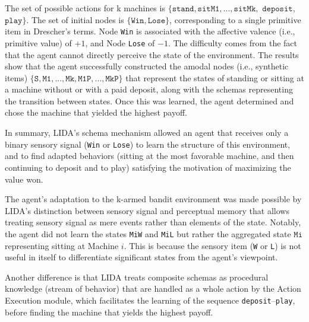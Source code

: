 \documentclass[runningheads]{llncs}
\begin{document}
The set of possible actions for k machines is $\{ \texttt{stand}, \texttt{sitM1},..., \texttt{sitMk},$ $\texttt{deposit},$ $\texttt{play} \}$. 
The set of initial nodes is $\{\texttt{Win}, \texttt{Lose} \}$, corresponding to a single primitive item in Drescher's terms.
Node \texttt{Win} is associated with the affective valence (i.e., primitive value) of $+1$, and Node \texttt{Lose} of $-1$.   
The difficulty comes from the fact that the agent cannot directly perceive the state of the environment.
The results show that the agent successfully constructed the amodal nodes (i.e., synthetic items) $\{ \texttt{S}, \texttt{M1},  ..., \texttt{Mk}, \texttt{M1P}, ...,  \texttt{MkP} \}$ that represent the states of standing or sitting at a machine without or with a paid deposit, along with the schemas representing the transition between states. 
Once this was learned, the agent determined and chose the machine that yielded the highest payoff.

In summary, LIDA's schema mechanism allowed an agent that receives only a binary sensory signal (\texttt{Win} or \texttt{Lose}) to learn the structure of this environment, and to find adapted behaviors (sitting at the most favorable machine, and then continuing to deposit and to play) satisfying the motivation of maximizing the value won. 

The agent's adaptation to the k-armed bandit environment was made possible by LIDA's distinction between sensory signal and perceptual memory that allows treating sensory signal as mere events rather than elements of the state. 
Notably, the agent did not learn the states \texttt{MiW} and \texttt{MiL} but rather the aggregated state $\texttt{Mi}$ representing sitting at Machine $i$.
This is because the sensory item (\texttt{W} or \texttt{L}) is not useful in itself to differentiate significant states from the agent's viewpoint. 

Another difference is that LIDA treats composite schemas as procedural knowledge (stream of behavior) that are handled as a whole action by the Action Execution module, which facilitates the learning of the sequence \texttt{deposit}--\texttt{play}, before finding the machine that yields the highest payoff. 

\end{document}
